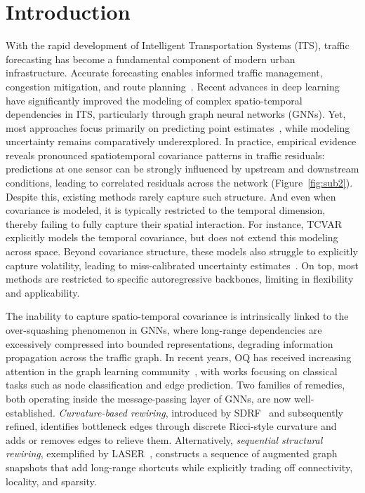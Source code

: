 \documentclass{article}
\theoremstyle{plain}
\theoremstyle{definition}
\theoremstyle{remark}
\begin{document}
\section{Introduction}
\label{sec:intro}
With the rapid development of Intelligent Transportation Systems (ITS), traffic forecasting has become a fundamental component of modern urban infrastructure. Accurate forecasting enables informed traffic management, congestion mitigation, and route planning~\cite{li2018diffusion}. Recent advances in deep learning have significantly improved the modeling of  complex spatio-temporal dependencies in ITS, particularly through graph neural networks (GNNs). 
 Yet, most approaches focus primarily on predicting point estimates~\cite{Benidis_2022, Song_Lin_Guo_Wan_2020, ijcai2019p264, Zheng_Fan_Wang_Qi_2020, salinas2019highdimensional, shang2021discrete, nie2023time}, while modeling uncertainty remains comparatively underexplored. In practice, empirical evidence reveals pronounced spatiotemporal covariance patterns in traffic residuals: predictions at one sensor can be strongly influenced by upstream and downstream conditions, leading to correlated residuals across the network (Figure~\ref{fig:sub2}). Despite this, existing methods rarely capture such structure. And even when covariance is modeled, it is typically restricted to the temporal dimension, thereby failing to fully capture their spatial interaction. For instance, TCVAR~\cite{zheng2024multivariateprobabilistictimeseries} explicitly models the temporal covariance, but does not extend this modeling across space.  Beyond covariance structure, these models also struggle to explicitly capture volatility, leading to miss-calibrated uncertainty estimates~\cite{UQTFF}. On top, most methods are restricted to specific autoregressive
backbones, limiting in flexibility and applicability.

The inability to capture spatio-temporal covariance is intrinsically linked to the over-squashing phenomenon in GNNs, where long-range dependencies are excessively compressed into bounded representations, degrading information propagation across the traffic graph. In recent years, OQ has received increasing attention in the graph learning community~\cite{topping2022understandingoversquashingbottlenecksgraphs,alon2021bottleneck}, with works focusing on classical tasks such as node classification and edge prediction. Two families of remedies, both operating inside the message-passing layer of GNNs, are now well-established. \emph{Curvature-based rewiring}, introduced by SDRF~\cite{topping2022understandingoversquashingbottlenecksgraphs} and subsequently refined, identifies bottleneck edges through discrete Ricci-style curvature and adds or removes edges to relieve them. Alternatively, \emph{sequential structural rewiring}, exemplified by LASER~\cite{barbero2024laser}, constructs a sequence of augmented graph snapshots that add long-range shortcuts while explicitly trading off connectivity, locality, and sparsity. 
\end{document}

